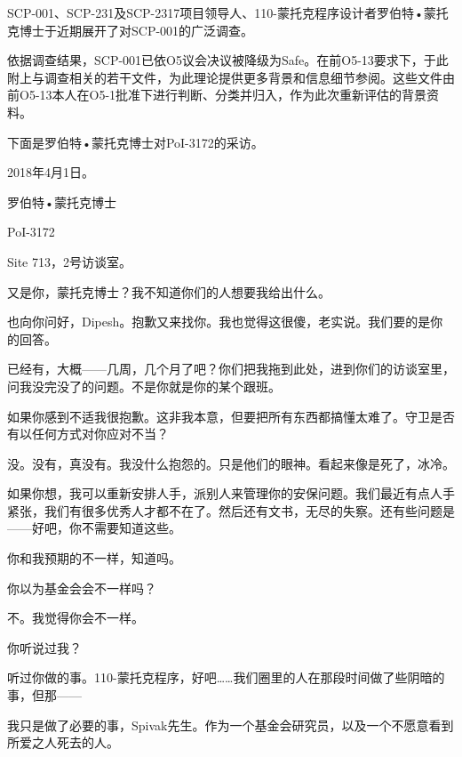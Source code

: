 SCP-001、SCP-231及SCP-2317项目领导人、110-蒙托克程序设计者罗伯特•蒙托克博士于近期展开了对SCP-001的广泛调查。

依据调查结果，SCP-001已依O5议会决议被降级为Safe。在前O5-13要求下，于此附上与调查相关的若干文件，为此理论提供更多背景和信息细节参阅。这些文件由前O5-13本人在O5-1批准下进行判断、分类并归入，作为此次重新评估的背景资料。



下面是罗伯特•蒙托克博士对PoI-3172的采访。

\begin{scpbox}

2018年4月1日。

罗伯特•蒙托克博士

PoI-3172

Site 713，2号访谈室。


又是你，蒙托克博士？我不知道你们的人想要我给出什么。

也向你问好，Dipesh。抱歉又来找你。我也觉得这很傻，老实说。我们要的是你的回答。

已经有，大概——几周，几个月了吧？你们把我拖到此处，进到你们的访谈室里，问我没完没了的问题。不是你就是你的某个跟班。

如果你感到不适我很抱歉。这非我本意，但要把所有东西都搞懂太难了。守卫是否有以任何方式对你应对不当？

没。没有，真没有。我没什么抱怨的。只是他们的眼神。看起来像是死了，冰冷。

如果你想，我可以重新安排人手，派别人来管理你的安保问题。我们最近有点人手紧张，我们有很多优秀人才都不在了。然后还有文书，无尽的失察。还有些问题是——好吧，你不需要知道这些。

你和我预期的不一样，知道吗。

你以为基金会会不一样吗？

不。我觉得你会不一样。

你听说过我？

听过你做的事。110-蒙托克程序，好吧……我们圈里的人在那段时间做了些阴暗的事，但那——

我只是做了必要的事，Spivak先生。作为一个基金会研究员，以及一个不愿意看到所爱之人死去的人。


\end{scpbox}
